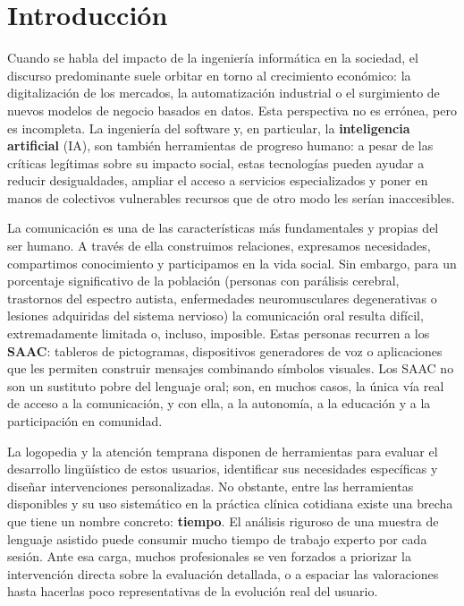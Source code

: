 \chapter{Introducción}
\label{chap:intro}

Cuando se habla del impacto de la ingeniería informática en la sociedad, el
discurso predominante suele orbitar en torno al crecimiento económico: la
digitalización de los mercados, la automatización industrial o el surgimiento
de nuevos modelos de negocio basados en datos. Esta perspectiva no es errónea,
pero es incompleta. La ingeniería del software y, en particular, la
\textbf{inteligencia artificial} (\ac{IA}), son también herramientas de
progreso humano: a pesar de las críticas legítimas sobre su impacto social,
estas tecnologías pueden ayudar a reducir desigualdades, ampliar el acceso a
servicios especializados y poner en manos de colectivos vulnerables recursos
que de otro modo les serían inaccesibles.

La comunicación es una de las características más fundamentales y propias del ser humano. 
A través de ella construimos relaciones, expresamos necesidades, compartimos conocimiento y
participamos en la vida social. Sin embargo, para un porcentaje significativo de
la población (personas con parálisis cerebral, trastornos del espectro
autista, enfermedades neuromusculares degenerativas o lesiones adquiridas del
sistema nervioso) la comunicación oral resulta difícil, extremadamente
limitada o, incluso, imposible. Estas personas recurren a los \textbf{\ac{SAAC}}: tableros de pictogramas,
dispositivos generadores de voz o aplicaciones que les permiten construir
mensajes combinando símbolos visuales. Los \ac{SAAC} no son un sustituto pobre
del lenguaje oral; son, en muchos casos, la única vía real de acceso a la
comunicación, y con ella, a la autonomía, a la educación y a la participación
en comunidad.

La logopedia y la atención temprana disponen de herramientas para evaluar el
desarrollo lingüístico de estos usuarios, identificar sus necesidades
específicas y diseñar intervenciones personalizadas. No obstante, entre las
herramientas disponibles y su uso sistemático en la práctica clínica cotidiana
existe una brecha que tiene un nombre concreto: \textbf{tiempo}. El análisis riguroso
de una muestra de lenguaje asistido puede consumir mucho tiempo de
trabajo experto por cada sesión. Ante esa carga, muchos profesionales se ven 
forzados a priorizar la intervención directa sobre la evaluación detallada, 
o a espaciar las valoraciones hasta hacerlas poco representativas de la 
evolución real del usuario.

